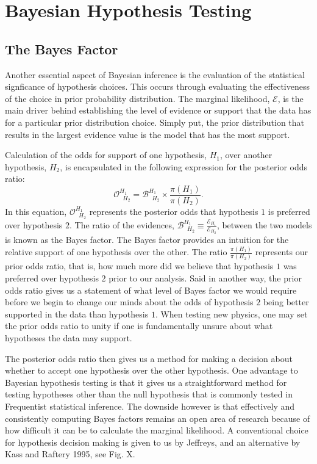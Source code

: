 \section{Bayesian Hypothesis Testing}
\subsection{The Bayes Factor}
Another essential aspect of Bayesian inference is the evaluation of the statistical signficance of hypothesis choices. This occurs through evaluating the effectiveness of the choice in prior probability distribution. The marginal likelihood, $\mathcal{E}$, is the main driver behind establishing the level of evidence or support that the data has for a particular prior distribution choice. Simply put, the prior distribution that results in the largest evidence value is the model that has the most support.

Calculation of the odds for support of one hypothesis, $H_1$, over another hypothesis, $H_2$, is encapsulated in the following expression for the posterior odds ratio:
\begin{equation}\label{eqn:odds_ratio}
\mathcal{O}^{H_1\;\;}_{\;\;H_2} = \mathcal{B}^{H_1\;\;}_{\;\;H_2} \times \frac{\pi(H_1)}{\pi(H_2)}.
\end{equation}
In this equation, $\mathcal{O}^{H_1\;\;}_{\;\;H_2}$ represents the posterior odds that hypothesis $1$ is preferred over hypothesis $2$. The ratio of the evidences, $\mathcal{B}^{H_1\;\;}_{\;\;H_2} \equiv \frac{\mathcal{E}_{H_1}}{\mathcal{E}_{H_2}}$, between the two models is known as the Bayes factor. The Bayes factor provides an intuition for the relative support of one hypothesis over the other. The ratio $\frac{\pi(H_1)}{\pi(H_2)}$ represents our prior odds ratio, that is, how much more did we believe that hypothesis $1$ was preferred over hypothesis $2$ prior to our analysis. Said in another way, the prior odds ratio gives us a statement of what level of Bayes factor we would require before we begin to change our minds about the odds of hypothesis $2$ being better supported in the data than hypothesis $1$. When testing new physics, one may set the prior odds ratio to unity if one is fundamentally unsure about what hypotheses the data may support.

The posterior odds ratio then gives us a method for making a decision about whether to accept one hypothesis over the other hypothesis. One advantage to Bayesian hypothesis testing is that it gives us a straightforward method for testing hypotheses other than the null hypothesis that is commonly tested in Frequentist statistical inference. The downside however is that effectively and consistently computing Bayes factors remains an open area of research because of how difficult it can be to calculate the marginal likelihood. A conventional choice for hypothesis decision making is given to us by Jeffreys, and an alternative by Kass and Raftery 1995, see Fig. X.

